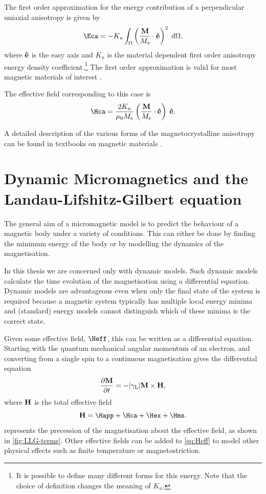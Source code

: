 The first order approximation for the energy contribution of a perpendicular uniaxial anisotropy is given by
\begin{equation}
  \Eca = -K_u \int_\magd \left( \frac{\Mv}{M_s} \cdot \ev \right)^2 \d \magd,
  \label{eq:36}
\end{equation}
where $\boldsymbol{\mathrm{\hat{e}}}$ is the easy axis and $K_u$ is the material dependent first order anisotropy energy density coefficient.\footnote{It is possible to define many different forms for this energy. Note that the choice of definition changes the meaning of $K_u$.}
The first order approximation is valid for most magnetic materials of interest \cite{Coey2010}.

The effective field corresponding to this case is
\begin{equation}
  \Hca = \frac{2 K_u}{\mu_0 M_s} \left( \frac{\Mv}{M_s} \cdot \ev \right) \; \ev.
  \label{eq:Hca}
\end{equation}

A detailed description of the various forms of the magnetocrystalline anisotropy can be found in textbooks on magnetic materials \cite{Coey2010} \cite{Aharoni1996}.


\section{Dynamic Micromagnetics and the Landau-Lifshitz-Gilbert equation}
\label{sec:land-lifsch-gilb}

The general aim of a micromagnetic model is to predict the behaviour of a magnetic body under a variety of conditions.
This can either be done by finding the minimum energy of the body or by modelling the dynamics of the magnetisation.

In this thesis we are concerned only with dynamic models.
Such dynamic models calculate the time evolution of the magnetisation using a differential equation.
Dynamic models are advantageous even when only the final state of the system is required because a magnetic system typically has multiple local energy minima and (standard) energy models cannot distinguish which of these minima is the correct state.

Given some effective field, $\Heff$, this can be written as a differential equation.
Starting with the quantum mechanical angular momentum of an electron, and converting from a single spin to a continuous magnetisation gives the differential equation \cite{Coey2010}
\begin{equation}
  \label{eq:38}
  \frac{\partial \boldsymbol{\mathrm{M}}}{\partial t} = - {\left|{\gamma_{\mathrm{\tiny{L}}}} \right|} \boldsymbol{\mathrm{M}} \times \boldsymbol{\mathrm{H}},
\end{equation}
where $\boldsymbol{\mathrm{H}}$ is the total effective field
\begin{equation}
  \Hv = \Happ + \Hca + \Hex + \Hms.
  \label{eq:Heff}
\end{equation}
 represents the precession of the magnetisation about the effective field, as shown in \cref{fig:LLG-terms}. Other effective fields can be added to \cref{eq:Heff} to model other physical effects such as finite temperature or magnetostriction.

